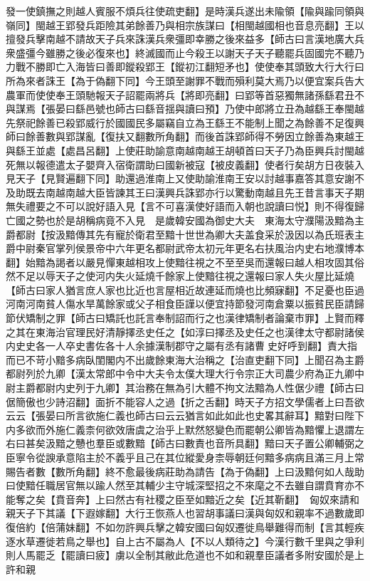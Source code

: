 發一使鎮撫之則越人賓服不煩兵往使疏吏翻】是時漢兵遂出未隃領【隃與踰同領與嶺同】閩越王郢發兵距險其弟餘善乃與相宗族謀曰【相閩越國相也音息亮翻】王以擅發兵擊南越不請故天子兵來誅漢兵衆彊即幸勝之後來益多【師古曰言漢地廣大兵衆盛彊今雖勝之後必復來也】終滅國而止今殺王以謝天子天子聽罷兵固國完不聽乃力戰不勝即亡入海皆曰善即鏦殺郢王【鏦初江翻短矛也】使使奉其頭致大行大行曰所為來者誅王【為于偽翻下同】今王頭至謝罪不戰而殞利莫大焉乃以便宜案兵告大農軍而使使奉王頭馳報天子詔罷兩將兵【將即亮翻】曰郢等首惡獨無諸孫繇君丑不與謀焉【張晏曰繇邑號也師古曰繇音揺與讀曰預】乃使中郎將立丑為越繇王奉閩越先祭祀餘善已殺郢威行於國國民多屬竊自立為王繇王不能制上聞之為餘善不足復興師曰餘善數與郢謀亂【復扶又翻數所角翻】而後首誅郢師得不勞因立餘善為東越王與繇王並處【處昌呂翻】上使莊助諭意南越南越王胡頓首曰天子乃為臣興兵討閩越死無以報德遣太子嬰齊入宿衛謂助曰國新被寇【被皮義翻】使者行矣胡方日夜裝入見天子【見賢遍翻下同】助還過淮南上又使助諭淮南王安以討越事嘉答其意安謝不及助既去南越南越大臣皆諫其王曰漢興兵誅郢亦行以驚動南越且先王昔言事天子期無失禮要之不可以說好語入見【言不可喜漢使好語而入朝也說讀曰悦】則不得復歸亡國之勢也於是胡稱病竟不入見　是歲韓安國為御史大夫　東海太守濮陽汲黯為主爵都尉【按汲黯傳其先有寵於衛君至黯十世世為卿大夫盖食采於汲因以為氏班表主爵中尉秦官掌列侯景帝中六年更名都尉武帝太初元年更名右扶風治内史右地濮博本翻】始黯為謁者以嚴見憚東越相攻上使黯往視之不至至吳而還報曰越人相攻固其俗然不足以辱天子之使河内失火延燒千餘家上使黯往視之還報曰家人失火屋比延燒【師古曰家人猶言庶人家也比近也言屋相近故連延而燒也比頻寐翻】不足憂也臣過河南河南貧人傷水旱萬餘家或父子相食臣謹以便宜持節發河南倉粟以振貧民臣請歸節伏矯制之罪【師古曰矯託也託言奉制詔而行之也漢律矯制者論棄市罪】上賢而釋之其在東海治官理民好清靜擇丞史任之【如淳曰擇丞及史任之也漢律太守都尉諸侯内史史各一人卒史書佐各十人余據漢制郡守之屬有丞有諸曹史好呼到翻】責大指而已不苛小黯多病臥閨閣内不出歲餘東海大治稱之【治直吏翻下同】上聞召為主爵都尉列於九卿【漢太常郎中令中大夫令太僕大理大行令宗正大司農少府為正九卿中尉主爵都尉内史列于九卿】其治務在無為引大體不拘文法黯為人性倨少禮【師古曰倨簡傲也少詩沼翻】面折不能容人之過【折之舌翻】時天子方招文學儒者上曰吾欲云云【張晏曰所言欲施仁義也師古曰云云猶言如此如此也史畧其辭耳】黯對曰陛下内多欲而外施仁義柰何欲效唐虞之治乎上默然怒變色而罷朝公卿皆為黯懼上退謂左右曰甚矣汲黯之戇也羣臣或數黯【師古曰數責也音所具翻】黯曰天子置公卿輔弼之臣寧令從諛承意陷主於不義乎且己在其位縱愛身柰辱朝廷何黯多病病且滿三月上常賜告者數【數所角翻】終不愈最後病莊助為請告【為于偽翻】上曰汲黯何如人哉助曰使黯任職居官無以踰人然至其輔少主守城深堅招之不來麾之不去雖自謂賁育亦不能奪之矣【賁音奔】上曰然古有社稷之臣至如黯近之矣【近其靳翻】　匈奴來請和親天子下其議【下遐嫁翻】大行王恢燕人也習胡事議曰漢與匈奴和親率不過數歲即復倍約【倍蒲妹翻】不如勿許興兵擊之韓安國曰匈奴遷徙鳥舉難得而制【言其輕疾逐水草遷徙若鳥之舉也】自上古不屬為人【不以人類待之】今漢行數千里與之爭利則人馬罷乏【罷讀曰疲】虜以全制其敝此危道也不如和親羣臣議者多附安國於是上許和親


